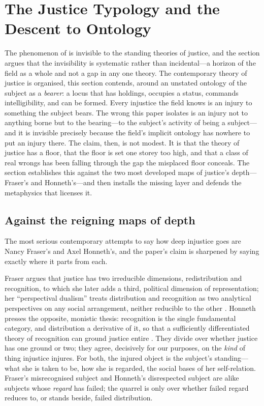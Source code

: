 \section{The Justice Typology and the Descent to Ontology}
\label{p18:sec:typology}

\noindent
The phenomenon of  is invisible to the standing theories of justice, and the section argues that the invisibility is systematic rather than incidental---a horizon of the field as a whole and not a gap in any one theory. The contemporary theory of justice is organised, this section contends, around an unstated ontology of the subject as a \emph{bearer}: a locus that has holdings, occupies a status, commands intelligibility, and can be formed. Every injustice the field knows is an injury to something the subject bears. The wrong this paper isolates is an injury not to anything borne but to the bearing---to the subject's activity of being a subject---and it is invisible precisely because the field's implicit ontology has nowhere to put an injury there. The claim, then, is not modest. It is that the theory of justice has a floor, that the floor is set one storey too high, and that a class of real wrongs has been falling through the gap the misplaced floor conceals. The section establishes this against the two most developed maps of justice's depth---Fraser's and Honneth's---and then installs the missing layer and defends the metaphysics that licenses it.

\subsection{Against the reigning maps of depth}
\label{p18:sub:typ-against}

The most serious contemporary attempts to say how deep injustice goes are Nancy Fraser's and Axel Honneth's, and the paper's claim is sharpened by saying exactly where it parts from each.

Fraser argues that justice has two irreducible dimensions, redistribution and recognition, to which she later adds a third, political dimension of representation; her ``perspectival dualism'' treats distribution and recognition as two analytical perspectives on any social arrangement, neither reducible to the other \parencite{fraserhonneth2003}. Honneth presses the opposite, monistic thesis: recognition is the single fundamental category, and distribution a derivative of it, so that a sufficiently differentiated theory of recognition can ground justice entire \parencite{honneth1995}. They divide over whether justice has one ground or two; they agree, decisively for our purposes, on the \emph{kind} of thing injustice injures. For both, the injured object is the subject's standing---what she is taken to be, how she is regarded, the social bases of her self-relation. Fraser's misrecognised subject and Honneth's disrespected subject are alike subjects whose \emph{regard} has failed; the quarrel is only over whether failed regard reduces to, or stands beside, failed distribution.

